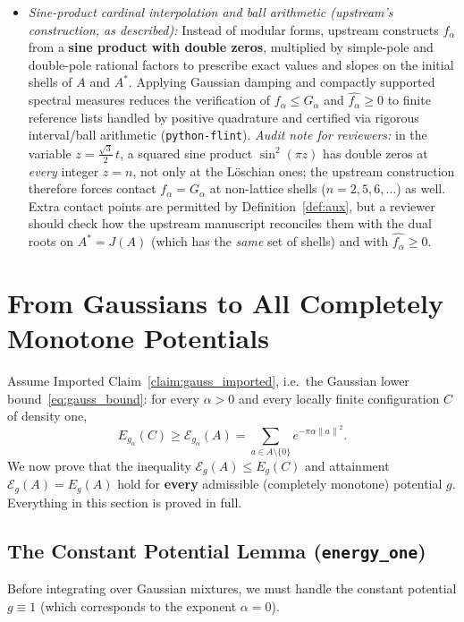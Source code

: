 \documentclass[11pt, a4paper]{article}
\theoremstyle{definition}
\theoremstyle{remark}
\newcommand{\Ecal}{\mathcal{E}}
\newcommand{\norm}[1]{\left\lVert #1 \right\rVert}
\begin{document}
\begin{enumerate}[label=\textbf{\arabic*.}]
\begin{itemize}
        \item \textit{Sine-product cardinal interpolation and ball arithmetic (upstream's construction, as described):} Instead of modular forms, upstream constructs $f_\alpha$ from a \textbf{sine product with double zeros}, multiplied by simple-pole and double-pole rational factors to prescribe exact values and slopes on the initial shells of $A$ and $A^*$. Applying Gaussian damping and compactly supported spectral measures reduces the verification of $f_\alpha \le G_\alpha$ and $\widehat{f_\alpha} \ge 0$ to finite reference lists handled by positive quadrature and certified via rigorous interval/ball arithmetic (\texttt{python-flint}). \textit{Audit note for reviewers:} in the variable $z = \tfrac{\sqrt{3}}{2}\, t$, a squared sine product $\sin^2(\pi z)$ has double zeros at \emph{every} integer $z = n$, not only at the L\"oschian ones; the upstream construction therefore forces contact $f_\alpha = G_\alpha$ at non-lattice shells ($n = 2, 5, 6, \dots$) as well. Extra contact points are permitted by Definition~\ref{def:aux}, but a reviewer should check how the upstream manuscript reconciles them with the dual roots on $A^* = J(A)$ (which has the \emph{same} set of shells) and with $\widehat{f_\alpha} \ge 0$.
    \end{itemize}
\end{enumerate}

\section{From Gaussians to All Completely Monotone Potentials}
\label{sec:gauss_to_cm}

Assume Imported Claim~\ref{claim:gauss_imported}, i.e.\ the Gaussian lower bound~\eqref{eq:gauss_bound}: for every $\alpha > 0$ and every locally finite configuration $C$ of density one,
\[
E_{g_\alpha}(C) \ge \Ecal_{g_\alpha}(A) = \sum_{a \in A \setminus \{0\}} e^{-\pi \alpha \norm{a}^2}.
\]
We now prove that the inequality $\Ecal_g(A) \le E_g(C)$ and attainment $\Ecal_g(A) = E_g(A)$ hold for \textbf{every} admissible (completely monotone) potential $g$. Everything in this section is proved in full.

\subsection{The Constant Potential Lemma (\texttt{energy\_one})}

Before integrating over Gaussian mixtures, we must handle the constant potential $g \equiv 1$ (which corresponds to the exponent $\alpha = 0$).
\end{document}
